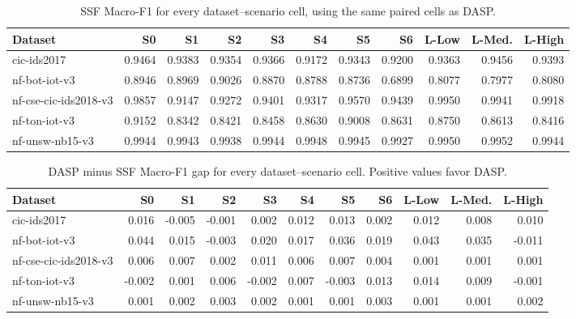\begin{table}[t]
\caption{SSF Macro-F1 for every dataset--scenario cell, using the same paired cells as DASP.}
\label{tab:ssf-cell-f1}
\centering
\scriptsize
\begin{tabular}{lrrrrrrrrrr}
\toprule
Dataset & S0 & S1 & S2 & S3 & S4 & S5 & S6 & L-Low & L-Med. & L-High\\
\midrule
cic-ids2017 & 0.9464 & 0.9383 & 0.9354 & 0.9366 & 0.9172 & 0.9343 & 0.9200 & 0.9363 & 0.9456 & 0.9393\\
nf-bot-iot-v3 & 0.8946 & 0.8969 & 0.9026 & 0.8870 & 0.8788 & 0.8736 & 0.6899 & 0.8077 & 0.7977 & 0.8080\\
nf-cse-cic-ids2018-v3 & 0.9857 & 0.9147 & 0.9272 & 0.9401 & 0.9317 & 0.9570 & 0.9439 & 0.9950 & 0.9941 & 0.9918\\
nf-ton-iot-v3 & 0.9152 & 0.8342 & 0.8421 & 0.8458 & 0.8630 & 0.9008 & 0.8631 & 0.8750 & 0.8613 & 0.8416\\
nf-unsw-nb15-v3 & 0.9944 & 0.9943 & 0.9938 & 0.9944 & 0.9948 & 0.9945 & 0.9927 & 0.9950 & 0.9952 & 0.9944\\
\bottomrule
\end{tabular}
\end{table}

\begin{table}[t]
\caption{DASP minus SSF Macro-F1 gap for every dataset--scenario cell. Positive values favor DASP.}
\label{tab:gap-cell}
\centering
\scriptsize
\begin{tabular}{lrrrrrrrrrr}
\toprule
Dataset & S0 & S1 & S2 & S3 & S4 & S5 & S6 & L-Low & L-Med. & L-High\\
\midrule
cic-ids2017 & 0.016 & -0.005 & -0.001 & 0.002 & 0.012 & 0.013 & 0.002 & 0.012 & 0.008 & 0.010\\
nf-bot-iot-v3 & 0.044 & 0.015 & -0.003 & 0.020 & 0.017 & 0.036 & 0.019 & 0.043 & 0.035 & -0.011\\
nf-cse-cic-ids2018-v3 & 0.006 & 0.007 & 0.002 & 0.011 & 0.006 & 0.007 & 0.004 & 0.001 & 0.001 & 0.001\\
nf-ton-iot-v3 & -0.002 & 0.001 & 0.006 & -0.002 & 0.007 & -0.003 & 0.013 & 0.014 & 0.009 & -0.001\\
nf-unsw-nb15-v3 & 0.001 & 0.002 & 0.003 & 0.002 & 0.001 & 0.001 & 0.003 & 0.001 & 0.001 & 0.002\\
\bottomrule
\end{tabular}
\end{table}

